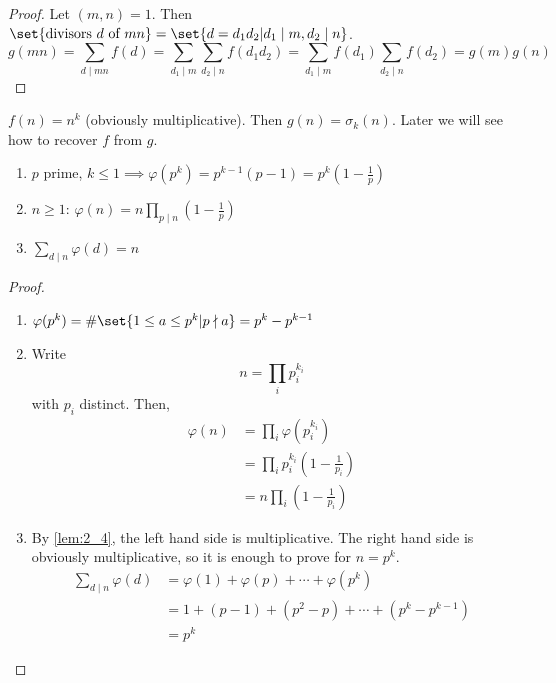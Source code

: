 \documentclass{article}
\begin{document}
\begin{proof}
    Let $(m, n) = 1$.
    Then $\set{ \text{divisors } d \text{ of } mn } = \set{ d = d_1 d_2 | d_1 \mid m, d_2 \mid n }$.
    \begin{equation*}
        g(mn) = \sum_{d \mid mn} f(d) = \sum_{d_1 \mid m} \sum_{d_2 \mid n} f(d_1 d_2) = \sum_{d_1 \mid m} f(d_1) \sum_{d_2 \mid n} f(d_2) = g(m)g(n)
    \end{equation*}
\end{proof}

\begin{eg}
    $f(n) = n^k$ (obviously multiplicative). Then $g(n) = \sigma_k(n)$.
    Later we will see how to recover $f$ from $g$.
\end{eg}

\begin{nthm}\label{thm:2_5}
    \leavevmode
    \begin{enumerate}[label=(\roman*)]
        \item $p$ prime, $k \leq 1 \implies \varphi(p^k) = p^{k-1} (p-1) = p^k \left(1-\frac{1}{p}\right)$
        \item $n \geq 1$: $\varphi (n) = n \prod_{p \mid n}\left( 1-\frac{1}{p} \right)$
        \item $\sum_{d \mid n} \varphi(d) = n$
    \end{enumerate}
\end{nthm}

\begin{proof}
    \leavevmode
    \begin{enumerate}[label=(\roman*)]
        \item $\varphi (p^k) = \# \set{ 1 \leq a \leq p^k | p \nmid a } = p^k - p^{k-1}$
        \item Write
            \begin{equation*}
                n = \prod_i p_i^{k_i}
            \end{equation*}
            with $p_i$ distinct. Then,
            \begin{align*}
                \varphi (n) &= \prod_i \varphi (p_i^{k_i}) \\%
                            &= \prod_i p_i^{k_i} \left(1 - \frac{1}{p_i}\right) \\
                            &= n \prod_i \left(1 - \frac{1}{p_i} \right)
            \end{align*}
        \item By \cref{lem:2_4}, the left hand side is multiplicative. The right hand side is obviously multiplicative, so it is enough to prove for $n = p^k$.
            \begin{align*}
                \sum_{d \mid n} \varphi(d) &= \varphi(1) + \varphi(p) + \dotsb + \varphi(p^k) \\
                                       &= 1 + (p - 1) + (p^2 - p) + \dotsb + (p^k - p^{k-1}) \\
                                       &= p^k
            \end{align*}
    \end{enumerate}
\end{proof}
\end{document}
